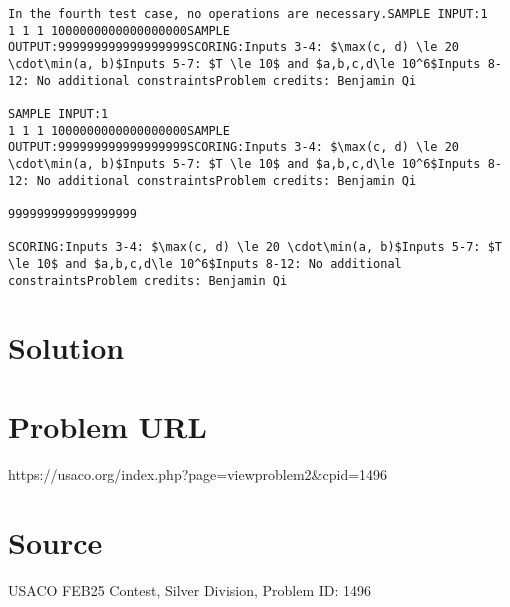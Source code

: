 \documentclass[12pt]{article}
\begin{document}
\begin{verbatim}
In the fourth test case, no operations are necessary.SAMPLE INPUT:1
1 1 1 1000000000000000000SAMPLE OUTPUT:999999999999999999SCORING:Inputs 3-4: $\max(c, d) \le 20 \cdot\min(a, b)$Inputs 5-7: $T \le 10$ and $a,b,c,d\le 10^6$Inputs 8-12: No additional constraintsProblem credits: Benjamin Qi

SAMPLE INPUT:1
1 1 1 1000000000000000000SAMPLE OUTPUT:999999999999999999SCORING:Inputs 3-4: $\max(c, d) \le 20 \cdot\min(a, b)$Inputs 5-7: $T \le 10$ and $a,b,c,d\le 10^6$Inputs 8-12: No additional constraintsProblem credits: Benjamin Qi

999999999999999999

SCORING:Inputs 3-4: $\max(c, d) \le 20 \cdot\min(a, b)$Inputs 5-7: $T \le 10$ and $a,b,c,d\le 10^6$Inputs 8-12: No additional constraintsProblem credits: Benjamin Qi
\end{verbatim}

\section*{Solution}


\section*{Problem URL}
https://usaco.org/index.php?page=viewproblem2&cpid=1496

\section*{Source}
USACO FEB25 Contest, Silver Division, Problem ID: 1496
\end{document}
